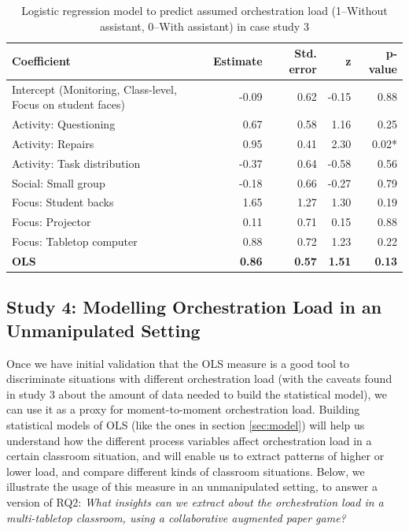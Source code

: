 \documentclass[10pt,journal,compsoc]{IEEEtran}
\begin{document}
\begin{table}[!t]
\caption{Logistic regression model to predict assumed orchestration load (1--Without assistant, 0--With assistant) in case study 3}
\label{tab:case3results}
\centering
\begin{tabular}{|p{2.8cm}||r|r|r|r|}
\hline
Coefficient & Estimate & Std. error & z & p-value\\
\hline
\hline
Intercept (Monitoring, Class-level, Focus on student faces) & -0.09 & 0.62 & -0.15 & 0.88 \\
Activity: Questioning & 0.67 & 0.58 & 1.16 & 0.25 \\
Activity: Repairs & 0.95 & 0.41 & 2.30 & 0.02* \\
Activity: Task distribution & -0.37 & 0.64 & -0.58 & 0.56 \\
Social: Small group & -0.18 & 0.66 & -0.27 & 0.79 \\
Focus: Student backs & 1.65 & 1.27 & 1.30 & 0.19 \\
Focus: Projector & 0.11 & 0.71 & 0.15 & 0.88 \\
Focus: Tabletop computer & 0.88 & 0.72 & 1.23 & 0.22 \\
\textbf{OLS} & \textbf{0.86} & \textbf{0.57} & \textbf{1.51} & \textbf{0.13} \\
\hline
\end{tabular}
\end{table}


\subsection{Study 4: Modelling Orchestration Load in an Unmanipulated Setting}
\label{sec:study4}

Once we have initial validation that the OLS measure is a good tool to discriminate situations with different orchestration load (with the caveats found in study 3 about the amount of data needed to build the statistical model), we can use it as a proxy for moment-to-moment orchestration load. Building statistical models of OLS (like the ones in section \ref{sec:model}) will help us understand how the different process variables affect orchestration load in a certain classroom situation, and will enable us to extract patterns of higher or lower load, and compare different kinds of classroom situations. Below, we illustrate the usage of this measure in an unmanipulated setting, to answer a version of RQ2: \textit{What insights can we extract about the orchestration load in a multi-tabletop classroom, using a collaborative augmented paper game?}
\end{document}

